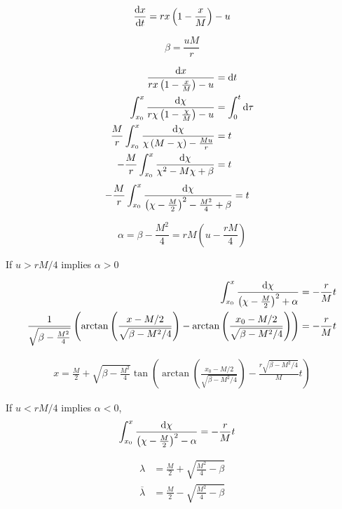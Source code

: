\begin{equation}
\frac{\mathrm{d} x}{{\mathrm{d} t}}=rx\left(1-\frac{x}{M}\right)-u \label{eq: ConstantHarvest}
\end{equation}

\begin{equation}
\beta=\frac{uM}{r}
\end{equation}

\begin{align*}
	\frac{\mathrm{d} x}{rx\left(1-\frac{x}{M}\right)-u}&=\mathrm{d} t \\
	\int_{x_0}^{x}\frac{\mathrm{d} \chi}{r\chi\left(1-\frac{\chi}{M}\right)-u}&=\int_{0}^{t}\mathrm{d} \tau \\
	\frac{M}{r}\int_{x_0}^{x}\frac{\mathrm{d} \chi}{\chi\left(M-\chi\right)-\frac{Mu}{r}}&=t \\
	-\frac{M}{r}\int_{x_0}^{x}\frac{\mathrm{d} \chi}{\chi^2-M\chi+\beta}&=t 
	\end{align*}
\begin{align}
	-\frac{M}{r}\int_{x_0}^{x}\frac{\mathrm{d} \chi}{\left(\chi-\frac{M}{2}\right)^2-\frac{M^2}{4}+\beta}&=t
\end{align}


\begin{equation}
	\alpha = \beta - \frac{M^2}{4} = rM\left(u-\frac{rM}{4}\right)
\end{equation}


If $u>rM/4$ implies $\alpha>0$

\begin{align*}
\int_{x_0}^{x}\frac{\mathrm{d} \chi}{\left(\chi-\frac{M}{2}\right)^2+\alpha}&=-\frac{r}{M}t \\
\frac{1}{\sqrt{\beta-\frac{M^2}{4}}}\left(\arctan\left(\frac{x-M/2}{\sqrt{\beta-M^2/4}}\right)-\arctan\left(\frac{x_0-M/2}{\sqrt{\beta-M^2/4}}\right)\right)&=-\frac{r}{M}t \\
\end{align*}

\begin{align}
	x=\frac{M}{2}+\sqrt{\beta-\frac{M^2}{4}} \tan \left(\arctan\left(\frac{x_0-M/2}{\sqrt{\beta-M^2/4}}\right)-\frac{r\sqrt{\beta-M^2/4}}{M}t\right)
\end{align}


If $u<rM/4$ implies $\alpha<0$,
\begin{align*}
	\int_{x_0}^{x}\frac{\mathrm{d} \chi}{\left(\chi-\frac{M}{2}\right)^2-\alpha} &=-\frac{r}{M}t
\end{align*}

\begin{equation}
	\begin{array}{cc}
	\lambda&=\frac{M}{2}+\sqrt{\frac{M^2}{4}-\beta} \\
	\overline{\lambda}&=\frac{M}{2}-\sqrt{\frac{M^2}{4}-\beta} \\
	\end{array}
\end{equation}

